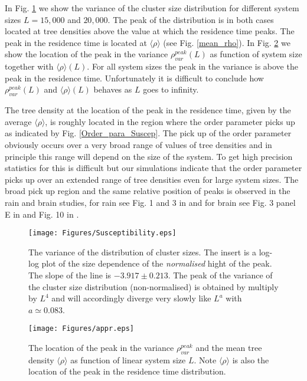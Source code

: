 \documentclass[aps,prl,showpacs,superscriptaddress,groupedaddress,notitlepage]{revtex4-1}
\begin{document}
In Fig. \ref{susceptible} we show the variance of the cluster size distribution for different system sizes $L=15,000$ and $20,000$. The peak of the distribution is in both cases located at tree densities above the value at which the residence time peaks. The peak in the residence time is located at $\langle \rho\rangle$ (see Fig. \ref{mean_rho}). In Fig. \ref{approach} we show the location of the peak in the variance $\rho_{var}^{peak}(L)$ as function of system size together with $\langle \rho\rangle(L)$. For all system sizes the peak in the variance is above the peak in the residence time. Unfortunately it is difficult to conclude how  $\rho_{var}^{peak}(L)$ and  $\langle \rho\rangle(L)$ behaves as $L$ goes to infinity. 

The tree density at the location of the peak in the residence time, given by the average $\langle \rho\rangle$, is roughly located in the region where the order parameter picks up as indicated by Fig. \ref{Order_para_Suscep}. The pick up of the order parameter obviously occurs over a very broad range of values of tree densities and in principle this range will depend on the size of the system. To get high precision statistics for this is difficult but our simulations indicate that the order parameter picks up over an extended range of tree densities even for large system sizes. The broad pick up region and the same relative position of peaks is observed in the rain and brain studies, for rain see Fig. 1 and 3 in \cite{Peters_Neelin2006} and for brain see Fig. 3 panel E in \cite{Chialvo2012} and  Fig. 10 in \cite{Scott2014}.  


\begin{figure}[!h]
\centering
\texttt{[image: Figures/Susceptibility.eps]}\\
  \caption{The variance of the distribution of cluster sizes. The insert is a log-log plot of the size dependence of the \textit{normalised} hight of the peak.  The slope of the line is $-3.917\pm 0.213$. The peak of the variance of the cluster size distribution (non-normalised) is obtained by multiply by $L^4$ and will accordingly diverge very slowly like $L^a$ with $a\simeq0.083$.}
\label{susceptible}
\end{figure}


\begin{figure}[!h]
\centering
\texttt{[image: Figures/appr.eps]}\\
  \caption{The location of the peak in the variance $\rho_{var}^{peak}$ and the mean tree density $\langle  \rho\rangle$ as function of linear system size $L$. Note $\langle  \rho\rangle$ is also the location of the peak in the residence time distribution.}
\label{approach}
\end{figure}
  
\end{document}
